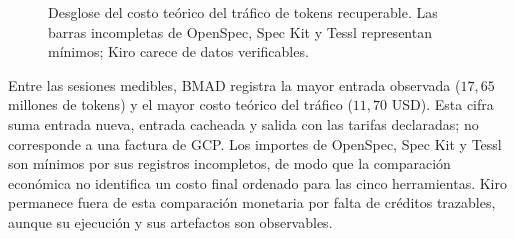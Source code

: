 \begin{figure}[H]
\centering
{}
\caption{Desglose del costo teórico del tráfico de tokens recuperable. Las barras incompletas de OpenSpec, Spec Kit y Tessl representan mínimos; Kiro carece de datos verificables.}
\label{fig:costos_tetris_init}
\end{figure}

Entre las sesiones medibles, BMAD registra la mayor entrada observada ($17,65$ millones de tokens) y el mayor costo teórico del tráfico ($11,70$ USD). Esta cifra suma entrada nueva, entrada cacheada y salida con las tarifas declaradas; no corresponde a una factura de GCP. Los importes de OpenSpec, Spec Kit y Tessl son mínimos por sus registros incompletos, de modo que la comparación económica no identifica un costo final ordenado para las cinco herramientas. Kiro permanece fuera de esta comparación monetaria por falta de créditos trazables, aunque su ejecución y sus artefactos son observables.

